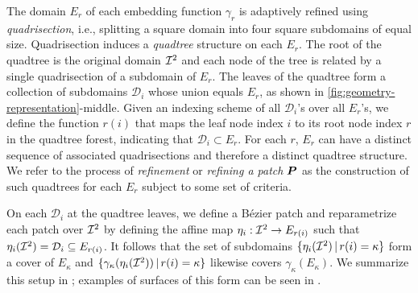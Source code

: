 The domain $E_r$ of each embedding function $\gamma_r$ is adaptively refined using \emph{quadrisection}, i.e., splitting a square domain into four square subdomains of equal size. %
Quadrisection induces a \textit{quadtree} structure on each $E_r$. 
The root of the quadtree is the original domain ${\mathcal{I}}^2$ and each node of the tree is related by a single quadrisection of a subdomain of $E_r$. 
The leaves of the quadtree form a collection of subdomains $\mathcal{D}_i$ whose union equals $E_r$, as shown in \cref{fig:geometry-representation}-middle.
Given an indexing scheme of all $\mathcal{D}_i$'s over all $E_r$'s, we define the function $r(i)$ that maps the leaf node index $i$ to its root node index $r$ in the quadtree forest, indicating that $\mathcal{D}_i \subset E_r$. 
For each $r$, $E_r$ can have a distinct sequence of associated quadrisections and therefore a distinct quadtree structure.
We refer to the process of \textit{refinement} or \textit{refining a patch ${\bm{P}}$} as the construction of such quadtrees for each $E_r$ subject to some set of criteria.

On each $\mathcal{D}_i$ at the quadtree leaves, we define a B\'ezier patch and reparametrize each patch over ${\mathcal{I}}^2$ by defining the affine map $\eta_i: {\mathcal{I}}^2 \to E_{r(i)}$ such that $\eta_i({\mathcal{I}}^2) = \mathcal{D}_i \subseteq E_{r(i)}$.
It follows that the set of subdomains $\{ \eta_i({\mathcal{I}}^2) \,| \,r(i) = \kappa\}$ form a cover of $E_\kappa$ and $\{ \gamma_\kappa(\eta_i({\mathcal{I}}^2))\, | \,r(i) = \kappa\}$ likewise covers $\gamma_\kappa(E_\kappa)$.
We summarize this setup in ; examples of surfaces of this form can be seen in .


